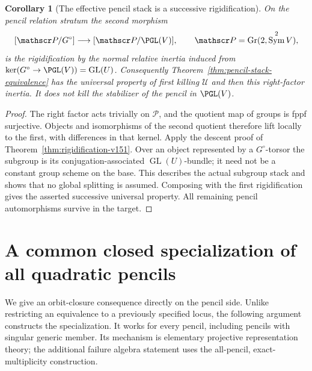 \documentclass[11pt,reqno]{amsart}
\numberwithin{equation}{section}
\newtheorem{corollary}[theorem]{Corollary}
\theoremstyle{definition}\newtheorem{definition}[theorem]{Definition}
\theoremstyle{remark}\newtheorem{remark}[theorem]{Remark}
\DeclareMathOperator{\Sym}{Sym}\DeclareMathOperator{\Gr}{Gr}
\begin{document}
\begin{corollary}[The effective pencil stack is a successive rigidification]
\label{cor:two-rigidifications-v151}
On the pencil relation stratum the second morphism
\[
 [\mathscr P/G^\circ]\longrightarrow[\mathscr P/\PGL(V)],
                     \qquad \mathscr P=\Gr(2,\Sym^2V),
\]
is the rigidification by the normal relative inertia induced from
\(\ker(G^\circ\to\PGL(V))=\operatorname{GL}(U)\).
Consequently Theorem~\ref{thm:pencil-stack-equivalence} has the
universal property of first killing \(\mathscr U\) and then this
right-factor inertia.  It does not kill the stabilizer of the pencil
in \(\PGL(V)\).
\end{corollary}
\begin{proof}
The right factor acts trivially on \(\mathscr P\), and the quotient
map of groups is fppf surjective.  Objects and isomorphisms of the
second quotient therefore lift locally to the first, with differences
in that kernel.  Apply the descent proof of
Theorem~\ref{thm:rigidification-v151}.  Over an object represented by
a \(G^\circ\)-torsor the subgroup is its conjugation-associated
\(\operatorname{GL}(U)\)-bundle; it need not be a constant group
scheme on the base.  This describes the actual subgroup stack and
shows that no global splitting is assumed.  Composing with the first
rigidification gives the asserted successive universal property.
All remaining pencil automorphisms survive in the target.
\end{proof}

\section{A common closed specialization of all quadratic pencils}
\label{sec:closed-pencil-v151}

We give an orbit-closure consequence directly on the pencil side.
Unlike restricting an equivalence to a previously specified locus, the
following argument constructs the specialization.  It works for every
pencil, including pencils with singular generic member.  Its mechanism
is elementary projective representation theory; the additional failure
algebra statement uses the all-pencil, exact-multiplicity construction.
\end{document}

